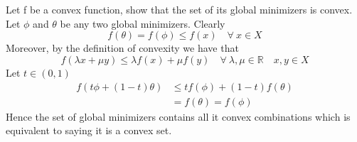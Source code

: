 \documentclass{article}
\begin{document}
		\clearpage
		
		\section{}
		Let f be a convex function, show that the set of its global minimizers is convex. Let $\phi$ and $\theta$ be any two global minimizers. Clearly
		\begin{equation}
			f(\theta) = f(\phi) \leq f(x) \quad  \forall \ x\in X
		\end{equation}
		Moreover, by the definition of convexity we have that 
		\begin{equation}
			f(\lambda x + \mu y) \leq \lambda f(x) + \mu f(y) \quad \forall \ \lambda, \mu \in \mathbb R \quad x,y \in X
		\end{equation}
		Let $t \in (0,1)$
		\begin{align*}
			f(t \phi + (1-t)\theta) &\leq t f(\phi) + (1-t) f(\theta) \\
			& = f(\theta) = f(\phi)
		\end{align*}
		Hence the set of global minimizers contains all it convex combinations which is equivalent to saying it is a convex set.
		
		\clearpage
		
\end{document}
